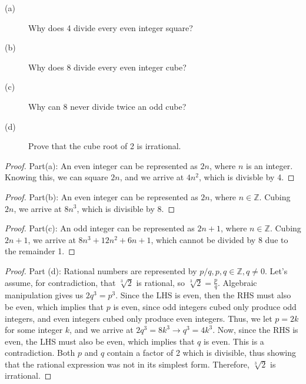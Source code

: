 \documentclass[11pt]{article}
\begin{document}

\begin{exercise}
\begin{description}
\item[(a)] Why does 4 divide every even integer square?
\item[(b)] Why does 8 divide every even integer cube?
\item[(c)] Why can 8 never divide twice an odd cube?
\item[(d)] Prove that the cube root of 2 is irrational.
\end{description}
\end{exercise}

\begin{solution}
\begin{proof}
    Part(a): An even integer can be represented as $2n$, where $n$ is an integer. Knowing this, we can square $2n$, and we arrive at $4n^2$, which is divisble by 4.
\end{proof}
\begin{proof}
    Part(b): An even integer can be represented as $2n$, where $n \in \mathbb{Z}$. Cubing $2n$, we arrive at $8n^3$, which is divisible by 8.  
\end{proof}
\begin{proof}
    Part(c): An odd integer can be represented as $2n+1$, where $n \in \mathbb{Z}$. Cubing $2n+1$, we arrive at $8n^3 + 12n^2 + 6n + 1$, which cannot be divided by 8 due to the remainder 1.
\end{proof}
\begin{proof}
    Part (d): Rational numbers are represented by $p/q, p,q \in \mathbb{Z}, q \neq 0$. Let's assume, for contradiction, that $\sqrt[3]{2}$ is rational, so $\sqrt[3]{2}=\frac{p}{q}$. Algebraic manipulation gives us $2q^3 = p^3$. Since the LHS is even, then the RHS must also be even, which implies that $p$ is even, since odd integers cubed only produce odd integers, and even integers cubed only produce even integers. Thus, we let $p = 2k$ for some integer $k$, and we arrive at $2q^3 = 8k^3 \rightarrow q^3 = 4k^3$. Now, since the RHS is even, the LHS must also be even, which implies that $q$ is even. This is a contradiction. Both $p$ and $q$ contain a factor of 2 which is divisible, thus showing that the rational expression was not in its simplest form. Therefore, $\sqrt[3]{2}$ is irrational.  
\end{proof}
\end{solution}
\end{document}
